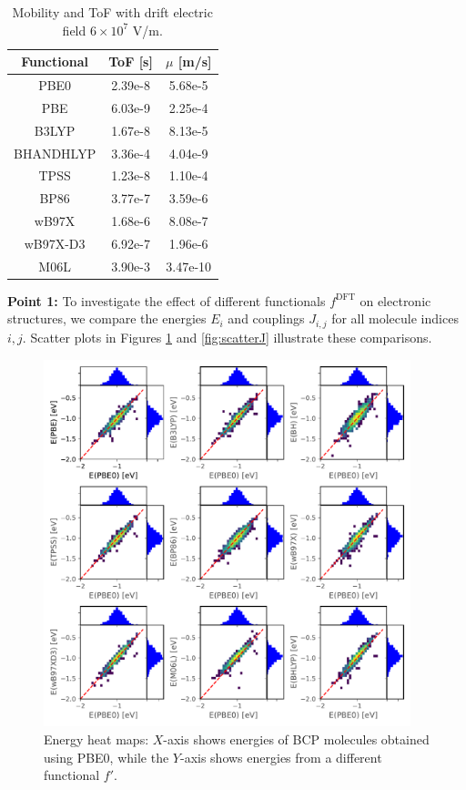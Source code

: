 \documentclass[letterpaper,12pt]{article}
\begin{document}
\begin{table}[h]
    \centering
    \begin{tabular}{c c c}
    \hline
        Functional & ToF [s] & $\mu$ [m/s] \\ 
        \hline
        PBE0 & 2.39e-8 & 5.68e-5 \\
        PBE & 6.03e-9 & 2.25e-4 \\ 
        B3LYP & 1.67e-8 & 8.13e-5 \\
        BHANDHLYP & 3.36e-4 & 4.04e-9 \\
        TPSS & 1.23e-8 & 1.10e-4 \\
        BP86 & 3.77e-7 & 3.59e-6 \\
        wB97X & 1.68e-6 & 8.08e-7 \\
        wB97X-D3 & 6.92e-7 & 1.96e-6 \\
        M06L & 3.90e-3 & 3.47e-10 \\
    \hline
    \end{tabular}
    \caption{Mobility and ToF with drift electric field $6 \times 10^7$ V/m.}
    \label{tab:para2}
\end{table}

\textbf{Point 1:} To investigate the effect of different functionals $f^\text{DFT}$ on electronic structures, we compare the energies $E_i$ and couplings $J_{i,j}$ for all molecule indices $i,j$. Scatter plots in Figures \ref{fig:scatterE} and \ref{fig:scatterJ} illustrate these comparisons.

\begin{figure}[h]
    \centering
    \includegraphics[width=0.95\textwidth]{figs/scatterE_all.pdf}
    \caption{Energy heat maps: $X$-axis shows energies of BCP molecules obtained using PBE0, while the $Y$-axis shows energies from a different functional $f'$.}
    \label{fig:scatterE}
\end{figure}
\end{document}

